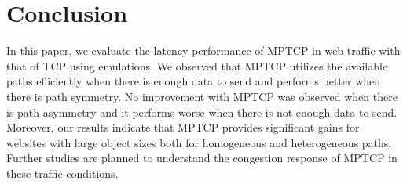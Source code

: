 \section{Conclusion}
\label{sec:conclusion}

In this paper, we evaluate the latency performance of MPTCP in web traffic with that of TCP using emulations. We observed that MPTCP utilizes the 
available paths efficiently when there is enough data to send and performs better when there is path symmetry. No improvement with MPTCP was observed
when there is path asymmetry and it performs worse when there is not enough data to send. Moreover, our results indicate that MPTCP provides significant 
gains for websites with large object sizes both for homogeneous and heterogeneous paths. Further studies are planned to understand the congestion response 
of MPTCP in these traffic conditions. 





